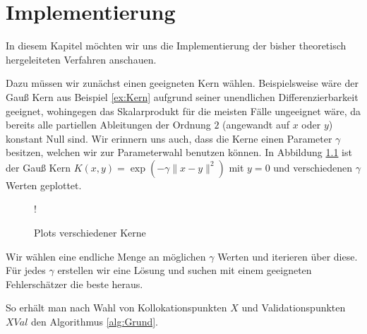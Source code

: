 \chapter{Implementierung}
\label{cha:Implementierung}

In diesem Kapitel möchten wir uns die Implementierung der bisher theoretisch hergeleiteten Verfahren anschauen.

Dazu müssen wir zunächst einen geeigneten Kern wählen. Beispielsweise wäre der Gauß Kern aus Beispiel \ref{ex:Kern} aufgrund seiner unendlichen Differenzierbarkeit geeignet, wohingegen das Skalarprodukt für die meisten Fälle ungeeignet wäre, da bereits alle partiellen Ableitungen der Ordnung $2$ (angewandt auf $x$ oder $y$) konstant Null sind. Wir erinnern uns auch, dass die Kerne einen Parameter $\gamma$ besitzen, welchen wir zur Parameterwahl benutzen können. In Abbildung \ref{fig:Kerne} ist der Gauß Kern $K(x,y) = \exp\left(-\gamma \|x-y\|^2\right)$ mit $y= 0$ und verschiedenen $\gamma$ Werten geplottet.
\begin{figure}[ht]
\centering
\resizebox {.8\columnwidth} {!} {

}
\caption{Plots verschiedener Kerne}
\label{fig:Kerne}
\end{figure}
Wir wählen eine endliche Menge an möglichen $\gamma$ Werten und iterieren über diese. Für jedes $\gamma$ erstellen wir eine Lösung und suchen mit einem geeigneten Fehlerschätzer die beste heraus.

So erhält man nach Wahl von Kollokationspunkten $X$ und Validationspunkten $XVal$ den Algorithmus \ref{alg:Grund}.


